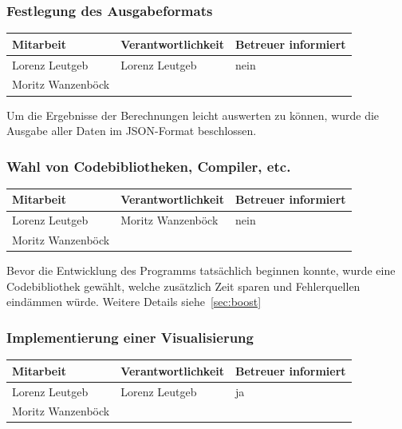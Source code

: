 \subsubsection{Festlegung des Ausgabeformats}

\begin{center}
\begin{tabular}{lll}
	Mitarbeit & Verantwortlichkeit & Betreuer informiert \\
	\hline
	Lorenz Leutgeb & Lorenz Leutgeb & nein \\
	Moritz Wanzenböck & & \\
\end{tabular}
\end{center}

Um die Ergebnisse der Berechnungen leicht auswerten zu können, wurde die Ausgabe aller Daten im JSON-Format beschlossen.

\subsubsection{Wahl von Codebibliotheken, Compiler, etc.}

\begin{center}
\begin{tabular}{lll}
	Mitarbeit & Verantwortlichkeit & Betreuer informiert \\
	\hline
	Lorenz Leutgeb & Moritz Wanzenböck & nein \\
	Moritz Wanzenböck & & \\
\end{tabular}
\end{center}

Bevor die Entwicklung des Programms tatsächlich beginnen konnte, wurde eine Codebibliothek gewählt, welche zusätzlich Zeit sparen und Fehlerquellen eindämmen würde. Weitere Details siehe~\ref{sec:boost}

\subsubsection{Implementierung einer Visualisierung}

\begin{center}
\begin{tabular}{lll}
	Mitarbeit & Verantwortlichkeit & Betreuer informiert \\
	\hline
	Lorenz Leutgeb & Lorenz Leutgeb & ja \\
	Moritz Wanzenböck & & \\
\end{tabular}
\end{center}

